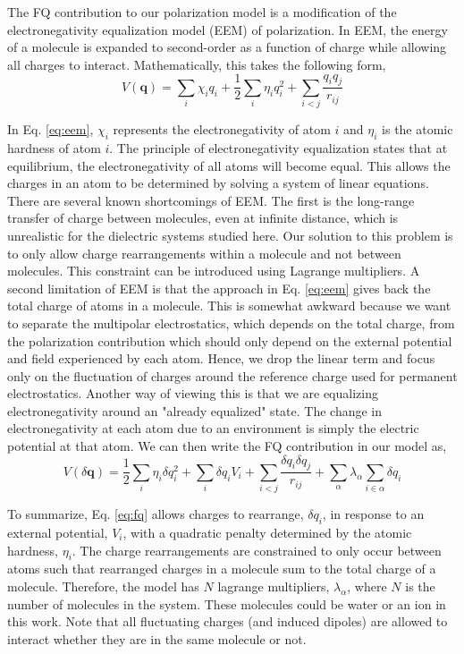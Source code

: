 \documentclass[journal=jacsat,manuscript=article]{achemso}
\begin{document}
The FQ contribution to our polarization model is a modification of the electronegativity equalization model (EEM) of polarization.\cite{mortier1986electronegativity} In EEM, the energy of a molecule is expanded to second-order as a function of charge while allowing all charges to interact. Mathematically, this takes the following form,
\begin{equation}
  V(\bm{q})=\sum_i \chi_i q_i + \frac12 \sum_i \eta_i q_i^2 + \sum_{i<j} \frac{q_i q_j}{r_{ij}}
  \label{eq:eem}
\end{equation}

In Eq. \ref{eq:eem}, $\chi_i$ represents the electronegativity of atom $i$ and $\eta_i$ is the atomic hardness of atom $i$. The principle of electronegativity equalization states that  at equilibrium, the electronegativity of all atoms will become equal. This allows the charges in an atom to be determined by solving a system of linear equations. There are several known shortcomings of EEM. The first is the long-range transfer of charge between molecules, even at infinite distance, which is unrealistic for the dielectric systems studied here.\cite{chen2007qtpie,chen2008unified} Our solution to this problem is to only allow charge rearrangements within a molecule and not between molecules. This constraint can be introduced using Lagrange multipliers. A second limitation of EEM is that the approach in Eq. \ref{eq:eem} gives back the total charge of atoms in a molecule. This is somewhat awkward because we want to separate the multipolar electrostatics, which depends on the total charge, from the polarization contribution which should only depend on the external potential and field experienced by each atom. Hence, we drop the linear term and focus only on the fluctuation of charges around the reference charge used for permanent electrostatics. Another way of viewing this is that we are equalizing electronegativity around an "already equalized" state. The change in electronegativity at each atom due to an environment is simply the electric potential at that atom. We can then write the FQ contribution in our model as,
\begin{equation}
  V(\delta \bm{q})=\frac12\sum_i \eta_i \delta q_i^2 + \sum_i \delta q_i V_i + \sum_{i<j}\frac{\delta q_i \delta q_j}{r_{ij}} + \sum_{\alpha}\lambda_\alpha \sum_{i\in\alpha}\delta q_{i}
  \label{eq:fq}
\end{equation}

To summarize, Eq. \ref{eq:fq} allows charges to rearrange, $\delta q_i$, in response to an external potential, $V_i$, with a quadratic penalty determined by the atomic hardness, $\eta_i$. The charge rearrangements are constrained to only occur between atoms such that rearranged charges in a molecule sum to the total charge of a molecule. Therefore, the model has $N$ lagrange multipliers, $\lambda_\alpha$, where $N$ is the number of molecules in the system. These molecules could be water or an ion in this work. Note that all fluctuating charges (and induced dipoles) are allowed to interact whether they are in the same molecule or not.
\end{document}
